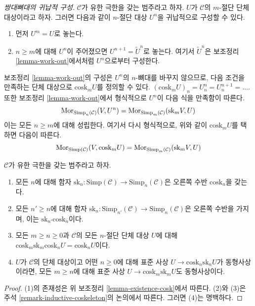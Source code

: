 \begin{remark}
\label{remark-inductive-coskeleton}
{\it 쌍대뼈대의 귀납적 구성.}
$\mathcal{C}$가 유한 극한을 갖는 범주라고 하자. $U$가 $\mathcal{C}$의
$m$-절단 단체 대상이라고 하자. 그러면 다음과 같이 $n$-절단 대상
$U^n$을 귀납적으로 구성할 수 있다.
\begin{enumerate}
\item 먼저 $U^m = U$로 놓는다.
\item $n \geq m$에 대해 $U^n$이 주어졌으면
$U^{n + 1} = \tilde U^n$로 놓는다. 여기서 $\tilde U^n$은 보조정리
\ref{lemma-work-out}에서처럼 $U^n$으로부터 구성한다.
\end{enumerate}
보조정리 \ref{lemma-work-out}의 구성은 $U^n$의 $n$-뼈대를 바꾸지 않으므로,
다음 조건을 만족하는 단체 대상으로 $\text{cosk}_m U$를 정의할 수 있다.
$(\text{cosk}_m U)_n = U^n_n = U^{n + 1}_n = \ldots$.
또한 보조정리 \ref{lemma-work-out}에서 형식적으로 $U^n$이 다음 식을
만족함이 따른다.
$$
\mathop{\mathrm{Mor}}\nolimits_{\text{Simp}_n(\mathcal{C})}(V, U^n)
=
\mathop{\mathrm{Mor}}\nolimits_{\text{Simp}_m(\mathcal{C})}(\text{sk}_mV, U)
$$
이는 모든 $n \geq m$에 대해 성립한다. 여기서 다시 형식적으로,
위와 같이 $\text{cosk}_mU$를 택하면 다음이 따른다.
$$
\mathop{\mathrm{Mor}}\nolimits_{\text{Simp}(\mathcal{C})}(V, \text{cosk}_mU)
=
\mathop{\mathrm{Mor}}\nolimits_{\text{Simp}_m(\mathcal{C})}(\text{sk}_mV, U)
$$
\end{remark}

\begin{lemma}
\label{lemma-cosk-up}
$\mathcal{C}$가 유한 극한을 갖는 범주라고 하자.
\begin{enumerate}
\item 모든 $n$에 대해 함자 $\text{sk}_n : \text{Simp}(\mathcal{C})
\to \text{Simp}_n(\mathcal{C})$은 오른쪽 수반 $\text{cosk}_n$을 갖는다.
\item 모든 $n' \geq n$에 대해 함자
$\text{sk}_n : \text{Simp}_{n'}(\mathcal{C}) \to \text{Simp}_n(\mathcal{C})$은
오른쪽 수반을 가지며, 이는 $\text{sk}_{n'}\text{cosk}_n$이다.
\item 모든 $m \geq n \geq 0$과 $\mathcal{C}$의 모든 $n$-절단 단체 대상
$U$에 대해
$\text{cosk}_m \text{sk}_m \text{cosk}_n U = \text{cosk}_n U$이다.
\item $U$가 $\mathcal{C}$의 단체 대상이고 어떤 $n \geq 0$에 대해
표준 사상 $U \to \text{cosk}_n \text{sk}_nU$가 동형사상이라면,
모든 $m \geq n$에 대해 표준 사상
$U \to \text{cosk}_m \text{sk}_mU$도 동형사상이다.
\end{enumerate}
\end{lemma}

\begin{proof}
(1)의 존재성은 위 보조정리 \ref{lemma-existence-cosk}에서 따른다.
(2)와 (3)은 주석 \ref{remark-inductive-coskeleton}의 논의에서 따른다.
그러면 (4)는 명백하다.
\end{proof}

